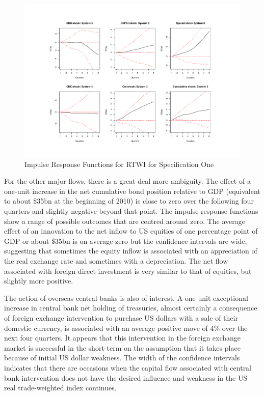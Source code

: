 \documentclass[12pt, a4paper, oneside]{article}\usepackage[]{graphicx}\usepackage[]{color}
\begin{document}
\begin{figure}
\graphicspath{{../Figures2/}}
\centering
\caption{Impulse Response Functions for RTWI for Specification One}
\label{fig:IRF1}
\includegraphics[scale=0.75]{IRF3}
\end{figure}

For the other major flows, there is a great deal more ambiguity.  The effect of a one-unit increase in the net cumulative bond position relative to GDP (equivalent to about \$35bn at the beginning of 2010) is close to zero over the following four quarters and slightly negative beyond that point.  The impulse response functions show a range of possible outcomes that are centred around zero.  The average effect of an innovation to the net inflow to US equities of one percentage point of GDP or about \$35bn is on average zero but the confidence intervals are wide, suggesting that sometimes the equity inflow is associated with an appreciation of the real exchange rate and sometimes with a depreciation.    The net flow associated with foreign direct investment is very similar to that of equities, but slightly more positive.  

The action of overseas central banks is also of interest.  A one unit exceptional increase in central bank net holding of treasuries, almost certainly a consequence of foreign exchange intervention to purchase US dollars with a sale of their domestic currency, is associated with an average positive move of 4\% over the next four quarters. It appears that this intervention in the foreign exchange market is successful in the short-term on the assumption that it takes place because of initial US dollar weakness. The width of the confidence intervals indicates that there are occasions when the capital flow associated with central bank intervention does not have the desired influence and weakness in the US real trade-weighted index continues.   
\end{document}
